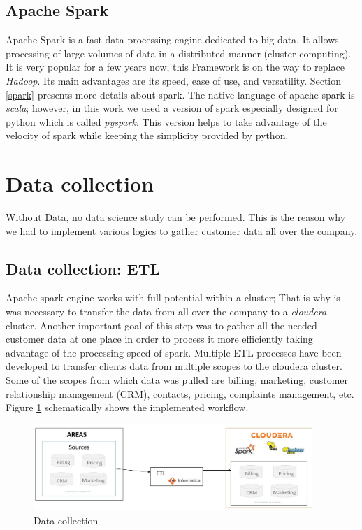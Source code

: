 \documentclass[LaM,binding=0.6cm, english]{sapthesis}
\begin{document}
\subsection{Apache Spark}

Apache Spark is a fast data processing engine dedicated to big data. It allows processing of large volumes of data in a distributed manner (cluster computing). It is very popular for a few years now, this Framework is on the way to replace \textit{Hadoop}. Its main advantages are its speed, ease of use, and versatility. Section \ref{spark} presents more details about spark. The native language of apache spark is \textit{scala}; however, in this work we used a version of spark especially designed for python which is called \textit{pyspark}. This version helps to take advantage of the velocity of spark while keeping the simplicity provided by python.

\section{Data collection}

Without Data, no data science study can be performed. This is the reason why we had to implement various logics to gather customer data all over the company.

\subsection{Data collection: ETL}

Apache spark engine works with full potential within a cluster; That is why is was necessary to transfer the data from all over the company to a \textit{cloudera} cluster. Another important goal of this step was to gather all the needed customer data at one place in order to process it more efficiently taking advantage of the processing speed of spark. Multiple ETL processes have been developed to transfer clients data from multiple scopes to the cloudera cluster. Some of the scopes from which data was pulled are billing, marketing, customer relationship management (CRM), contacts, pricing, complaints management, etc. Figure \ref{fig:data-collection} schematically shows the implemented workflow. 

\begin{figure}[!ht]
    \includegraphics[width=0.95\textwidth]{images/data_collection.jpg}
    \centering
    \caption{Data collection}
    \label{fig:data-collection}
\end{figure}
\end{document}
